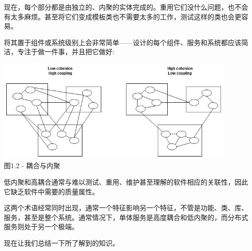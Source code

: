 现在，每个部分都是由独立的、内聚的实体完成的。重用它们没什么问题，也不会有太多麻烦。甚至将它们变成模板类也不需要太多的工作，测试这样的类也会更容易。

将其置于组件或系统级别上会非常简单——设计的每个组件、服务和系统都应该简洁，专注于做一件事，并且把它做好:

\begin{center}
\includegraphics[width=0.9\textwidth]{content/1/chapter1/images/2.jpg}\\
图1.2 - 耦合与内聚
\end{center}

低内聚和高耦合通常与难以测试、重用、维护甚至理解的软件相应的关联性，因此它缺乏软件中需要的质量属性。

这两个术语经常同时出现，通常一个特征影响另一个特征，不管是功能、类、库、服务，甚至是整个系统。通常情况下，单体服务是高度耦合和低内聚的，而分布式服务则处于另一个极端。

现在让我们总结一下所了解到的知识。